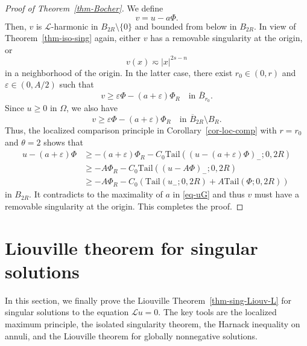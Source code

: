 \documentclass[11pt]{amsart}
\theoremstyle{plain}
\theoremstyle{definition}
\numberwithin{equation}{section}
\begin{document}
\begin{proof}[Proof of Theorem~\ref{thm-Bocher}]
    We define
    \begin{equation*}
        v= u-a\Phi.
    \end{equation*}
    Then, $v$ is $\mathcal{L}$-harmonic in $B_{2R} \setminus \{0\}$ and bounded from below in $B_{2R}$. In view of Theorem~\ref{thm-iso-sing} again, either $v$ has a removable singularity at the origin, or 
    \begin{equation*}
        v(x) \eqsim |x|^{2s-n}
    \end{equation*}
    in a neighborhood of the origin. In the latter case, there exist $r_0 \in (0, r)$ and $\varepsilon \in (0, A/2)$ such that
    \begin{equation*}
        v \geq \varepsilon \Phi - (a+\varepsilon)\Phi_R \quad\text{in }\overline{B}_{r_0}.
    \end{equation*}
    Since $u \geq 0$ in $\Omega$, we also have
    \begin{equation*}
        v \geq \varepsilon \Phi - (a+\varepsilon)\Phi_R \quad\text{in }\overline{B}_{2R} \setminus B_R.
    \end{equation*}
Thus, the localized comparison principle in Corollary~\ref{cor-loc-comp} with $r=r_0$ and $\theta=2$ shows that
    \begin{align*}
        u-(a+\varepsilon)\Phi
        &\geq - (a+\varepsilon)\Phi_R -C_0 \mathrm{Tail}( (u-(a+\varepsilon)\Phi)_-;0, 2R) \\
        &\geq - A \Phi_R -C_0 \mathrm{Tail}( (u-A \Phi)_-;0, 2R) \\
        &\geq - A \Phi_R -C_0 (\mathrm{Tail}(u_-; 0, 2R) + A\mathrm{Tail}(\Phi; 0, 2R))
    \end{align*}
    in $B_{2R}$. It contradicts to the maximality of $a$ in \eqref{eq-uG} and thus $v$ must have a removable singularity at the origin. This completes the proof.
\end{proof}



\section{Liouville theorem for singular solutions}\label{sec-liouville}

In this section, we finally prove the Liouville Theorem~\ref{thm-sing-Liouv-L} for singular solutions to the equation $\mathcal{L}u=0$. The key tools are the localized maximum principle, the isolated singularity theorem, the Harnack inequality on annuli, and the Liouville theorem for globally nonnegative solutions.
\end{document}
